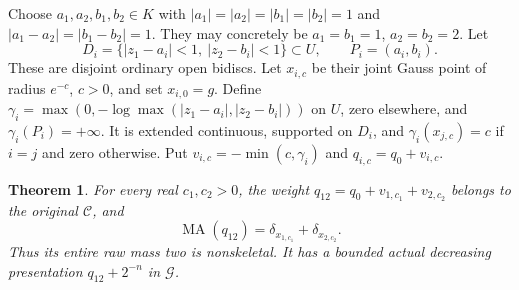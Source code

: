 \documentclass[11pt]{article}
\newtheorem{theorem}{Theorem}
\newcommand{\MA}{\operatorname{MA}}
\newcommand{\C}{\mathcal C}
\newcommand{\G}{\mathcal G}
\begin{document}
Choose $a_1,a_2,b_1,b_2\in K$ with
$|a_1|=|a_2|=|b_1|=|b_2|=1$ and
$|a_1-a_2|=|b_1-b_2|=1$. They may concretely be $a_1=b_1=1$,
$a_2=b_2=2$. Let
\[
 D_i=\{|z_1-a_i|<1,\ |z_2-b_i|<1\}\subset U,
 \qquad P_i=(a_i,b_i).
\]
These are disjoint ordinary open bidiscs. Let $x_{i,c}$ be their joint
Gauss point of radius $e^{-c}$, $c>0$, and set $x_{i,0}=g$.
Define $\gamma_i=\max(0,-\log\max(|z_1-a_i|,|z_2-b_i|))$ on $U$,
zero elsewhere, and $\gamma_i(P_i)=+\infty$.
It is extended continuous, supported on $D_i$, and
$\gamma_i(x_{j,c})=c$ if $i=j$ and zero otherwise.
Put $v_{i,c}=-\min(c,\gamma_i)$ and $q_{i,c}=q_0+v_{i,c}$.

\begin{theorem}\label{two}
For every real $c_1,c_2>0$, the weight
$q_{12}=q_0+v_{1,c_1}+v_{2,c_2}$ belongs to the original $\C$, and
\[
 \MA(q_{12})=\delta_{x_{1,c_1}}+\delta_{x_{2,c_2}}.
\]
Thus its entire raw mass two is nonskeletal. It has a bounded actual
decreasing presentation $q_{12}+2^{-n}$ in $\G$.
\end{theorem}
\end{document}
